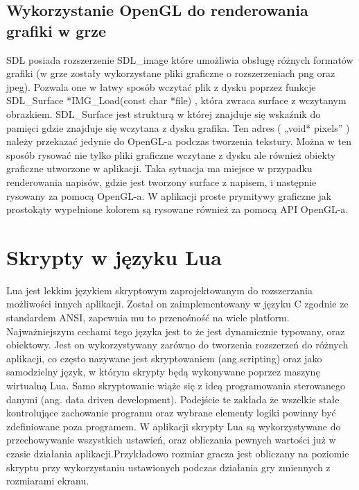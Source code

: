 \subsection{Wykorzystanie OpenGL do renderowania grafiki w grze}
SDL posiada rozszerzenie SDL\_image które umożliwia obsługę różnych formatów grafiki (w grze zostały wykorzystane pliki graficzne o rozszerzeniach png oraz jpeg). Pozwala one w łatwy sposób wczytać plik z dysku poprzez funkcje SDL\_Surface *IMG\_Load(const char *file) , która zwraca surface z
wczytanym obrazkiem. SDL\_Surface jest strukturą w której znajduje się wskaźnik do pamięci gdzie znajduje się wczytana z dysku grafika. Ten adres (
„void* pixels” ) należy przekazać jedynie do OpenGL-a podczas tworzenia tekstury.
Można w ten sposób rysować nie tylko pliki graficzne wczytane z dysku ale również obiekty graficzne utworzone w aplikacji. Taka sytuacja ma miejsce w
przypadku renderowania napisów, gdzie jest tworzony surface z napisem, i następnie rysowany za pomocą OpenGL-a. W aplikacji proste prymitywy graficzne
jak prostokąty wypełnione kolorem są rysowane również za pomocą API OpenGL-a.


\section{Skrypty w języku Lua}
\hspace{1cm} Lua jest lekkim językiem skryptowym zaprojektowanym do rozszerzania możliwości innych aplikacji. Został on zaimplementowany w języku C zgodnie ze standardem ANSI, zapewnia mu to przenośność na wiele platform. Najważniejszym cechami tego języka jest to że jest dynamicznie typowany, oraz obiektowy. Jest on wykorzystywany zarówno do tworzenia rozszerzeń do różnych aplikacji, co często nazywane jest skryptowaniem (ang.scripting) oraz jako samodzielny język, w którym skrypty będą wykonywane poprzez maszynę wirtualną Lua. Samo skryptowanie wiąże się z ideą programowania sterowanego danymi (ang. data driven development).
Podejście te zakłada że wszelkie stałe kontrolujące zachowanie programu oraz wybrane elementy logiki powinny być zdefiniowane poza programem. W aplikacji skrypty Lua są wykorzystywane do przechowywanie wszystkich ustawień, oraz obliczania pewnych wartości 
już w czasie działania aplikacji.Przykładowo rozmiar gracza jest obliczany na poziomie skryptu przy wykorzystaniu ustawionych podczas działania gry zmiennych z rozmiarami ekranu. 

